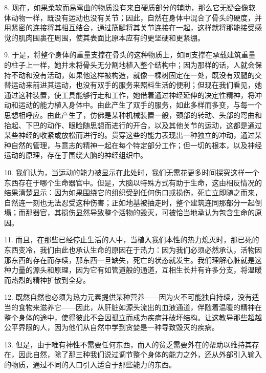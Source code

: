 8. 现在，如果柔软而易弯曲的物质没有来自硬质部分的辅助，那么它无疑会像软体动物一样，既没有运动也没有关节；因此，自然在身体中混合了骨头的硬度，并用紧密的连接将其相互结合，通过筋腱将其关节连接在一起，这样就将那能接受感觉的肌肉围裹在周围，使其表面比原本应有的更坚硬和更紧绷。\par

9. 于是，将整个身体的重量支撑在骨头的这种物质上，如同支撑在承载建筑重量的柱子上一样，她并未将骨头无分割地植入整个结构中；因为那样的话，人就会保持不动和没有活动，如果他这样被构造，就像一棵树固定在一处，既没有双腿的交替运动来前进其运动，也没有双手的服务来照料生活的便利；但现在我们看见，她通过这种装置，使工具能够行走和工作，她借着通过神经延伸的决定性精神，将冲动和运动的能力植入身体中。由此产生了双手的服务，如此多样而多变，与每一个思想相呼应。由此产生了，仿佛是某种机械装置一般，颈部的转动、头部的弯曲和抬起、下巴的动作、眼睑随思想而进行的开合，以及其他关节的运动，这都是通过某些神经的收紧或放松而进行的。贯穿这些的能力表现出一种独立的冲动，通过某种自然的管理，与意志的精神一起在每个特定部分工作；但一切的根本，以及神经运动的原理，存在于围绕大脑的神经组织中。\par

10. 我们认为，当运动的能力被显示在此处时，我们无需花更多时间探究这样一个东西存在于哪个生命器官中。但是，大脑以特殊方式有助于生命，这由相反情况的结果清楚显示：因为如果围绕它的组织受到任何伤口或损伤，死亡立即随之而来，自然连一刻也无法忍受这种伤害；正如地基被抽走时，整个建筑连同那部分一起倒塌；而那器官，其损伤显然导致整个活物的毁灭，可被恰当地承认为包含生命的原因。\par

11. 而且，在那些已经停止生活的人中，当植入我们本性的热力熄灭时，那已死的东西变冷，我们由此也承认生命的原因在于热力：因为我们必须必然承认，活物因那东西的存在而存续，那东西一旦缺失，死亡的状态就发生。我们理解心脏就是这种力量的源头和原理，因为它有如管道般的通道，互相生长并有许多分支，将温暖而热烈的精神扩散到全身。\par

12. 既然自然也必须为热力元素提供某种营养——因为火不可能独自持续，没有适当的食物来滋养它——因此，从肝脏如源头流出的血液通道，伴随着温暖的精神在整个身体的途中，使得彼此不会因孤立而成为疾病并破坏结构。让这教导那些超越公平界限的人，因为他们从自然中学到贪婪是一种导致毁灭的疾病。\par

13. 但是，由于唯有神性不需要任何东西，而人的贫乏需要外在的帮助以维持其存在，因此自然，除了那三种我们说过调节整个身体的能力之外，还从外部引入输入的物质，通过不同的入口引入适合于那些能力的东西。\par

